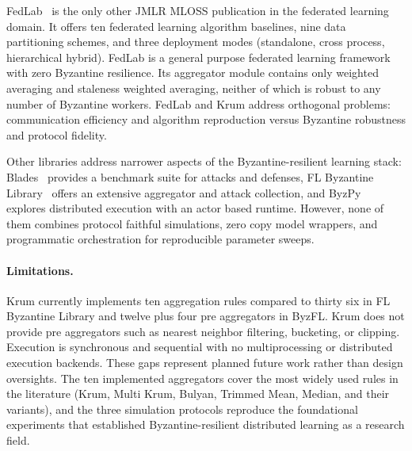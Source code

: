 \documentclass[twoside,11pt]{article}
\begin{document}
FedLab~\citep{fedlab} is the only other JMLR MLOSS publication in the federated learning domain. It offers ten federated learning algorithm baselines, nine data partitioning schemes, and three deployment modes (standalone, cross process, hierarchical hybrid). FedLab is a general purpose federated learning framework with zero Byzantine resilience. Its aggregator module contains only weighted averaging and staleness weighted averaging, neither of which is robust to any number of Byzantine workers. FedLab and Krum address orthogonal problems: communication efficiency and algorithm reproduction versus Byzantine robustness and protocol fidelity.

Other libraries address narrower aspects of the Byzantine-resilient learning stack: Blades~\citep{blades} provides a benchmark suite for attacks and defenses, FL Byzantine Library~\citep{flbyzlib} offers an extensive aggregator and attack collection, and ByzPy~\citep{byzpy} explores distributed execution with an actor based runtime. However, none of them combines protocol faithful simulations, zero copy model wrappers, and programmatic orchestration for reproducible parameter sweeps.

\paragraph{Limitations.}
Krum currently implements ten aggregation rules compared to thirty six in FL Byzantine Library and twelve plus four pre aggregators in ByzFL. Krum does not provide pre aggregators such as nearest neighbor filtering, bucketing, or clipping. Execution is synchronous and sequential with no multiprocessing or distributed execution backends. These gaps represent planned future work rather than design oversights. The ten implemented aggregators cover the most widely used rules in the literature (Krum, Multi Krum, Bulyan, Trimmed Mean, Median, and their variants), and the three simulation protocols reproduce the foundational experiments that established Byzantine-resilient distributed learning as a research field. 
\end{document}
